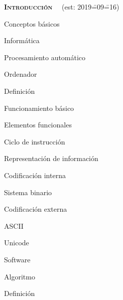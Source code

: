 \begin{longenum}
    \item \textbf{\textsc{Introducción}} \ \ (est: 2019\==09\==16)
    \begin{longenum}
        \item Conceptos básicos
        \begin{longenum}
            \item Informática
            \begin{longenum}
                \item Procesamiento automático
            \end{longenum}
            \item Ordenador
            \begin{longenum}
                \item Definición
                \item Funcionamiento básico
                \begin{longenum}
                    \item Elementos funcionales
                    \item Ciclo de instrucción
                    \item Representación de información
                    \begin{longenum}
                        \item Codificación interna
                        \begin{longenum}
                            \item Sistema binario
                        \end{longenum}
                        \item Codificación externa
                        \begin{longenum}
                            \item ASCII
                            \item Unicode
                        \end{longenum}
                    \end{longenum}
                \end{longenum}
            \end{longenum}
            \item Software
            \item Algoritmo
            \begin{longenum}
                \item Definición

\end{longenum}
\end{longenum}
\end{longenum}
\end{longenum}
